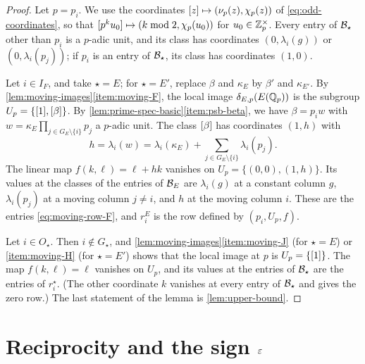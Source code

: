\begin{proof}
Let $p=p_i$. We use the coordinates $[z]\mapsto(\nu_p(z),\chi_p(z))$ of \eqref{eq:odd-coordinates}, so that $[p^ku_0]\mapsto(k\bmod2,\chi_p(u_0))$ for $u_0\in\mathbb Z_p^\times$. Every entry of $\mathcal B_\star$ other than $p_i$ is a $p$-adic unit, and its class has coordinates $(0,\lambda_i(g))$ or $(0,\lambda_i(p_j))$; if $p_i$ is an entry of $\mathcal B_\star$, its class has coordinates $(1,0)$.

Let $i\in I_F$, and take $\star=E$; for $\star=E'$, replace $\beta$ and $\kappa_E$ by $\beta'$ and $\kappa_{E'}$. By \cref{lem:moving-images}\ref{item:moving-F}, the local image $\delta_{E,p}(E(\mathbb Q_p))$ is the subgroup $U_p=\{[1],[\beta]\}$. By \cref{lem:prime-spec-basic}\ref{item:psb-beta}, we have $\beta=p_iw$ with $w=\kappa_E\prod_{j\in G_E\setminus\{i\}}p_j$ a $p$-adic unit. The class $[\beta]$ has coordinates $(1,h)$ with
\begin{equation}
h=\lambda_i(w)=\lambda_i(\kappa_E)+\sum_{j\in G_E\setminus\{i\}}\lambda_i(p_j).
\end{equation}
The linear map $f(k,\ell)=\ell+hk$ vanishes on $U_p=\{(0,0),(1,h)\}$. Its values at the classes of the entries of $\mathcal B_E$ are $\lambda_i(g)$ at a constant column $g$, $\lambda_i(p_j)$ at a moving column $j\ne i$, and $h$ at the moving column $i$. These are the entries \eqref{eq:moving-row-F}, and $r^E_i$ is the row defined by $(p_i,U_p,f)$.

Let $i\in O_\star$. Then $i\notin G_\star$, and \cref{lem:moving-images}\ref{item:moving-J} (for $\star=E$) or \ref{item:moving-H} (for $\star=E'$) shows that the local image at $p$ is $U_p=\{[1]\}$. The map $f(k,\ell)=\ell$ vanishes on $U_p$, and its values at the entries of $\mathcal B_\star$ are the entries of $r^\star_i$. (The other coordinate $k$ vanishes at every entry of $\mathcal B_\star$ and gives the zero row.) The last statement of the lemma is \cref{lem:upper-bound}.
\end{proof}

\section{Reciprocity and the sign \texorpdfstring{$\varepsilon$}{epsilon}}\label{sec:families-reciprocity}

